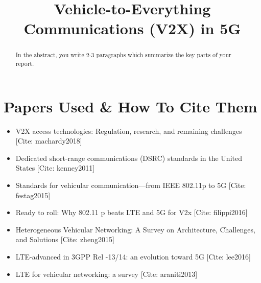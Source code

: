 \documentclass[conference,12pt,onecolumn]{IEEEtran}
\begin{document}
%
\title{Vehicle-to-Everything Communications (V2X) in 5G}


\author{
}


\maketitle

\begin{abstract}
In the abstract, you write 2-3 paragraphs which summarize the key parts of your report.
\end{abstract}


\IEEEpeerreviewmaketitle

\section{Papers Used \& How To Cite Them}
\begin{itemize}
\item V2X access technologies: Regulation, research, and remaining challenges [Cite: machardy2018] \cite{machardy2018}
\item Dedicated short-range communications (DSRC) standards in the United States [Cite: kenney2011] \cite{kenney2011}
\item Standards for vehicular communication---from IEEE 802.11p to 5G [Cite: festag2015]\cite{festag2015}
\item Ready to roll: Why 802.11 p beats LTE and 5G for V2x [Cite: filippi2016] \cite{filippi2016}
\item Heterogeneous Vehicular Networking: A Survey on Architecture, Challenges, and Solutions [Cite: zheng2015] \cite{zheng2015}
\item LTE-advanced in 3GPP Rel -13/14: an evolution toward 5G [Cite: lee2016] \cite{lee2016}
  \item LTE for vehicular networking: a survey [Cite: araniti2013] \cite{araniti2013}
  \end{itemize}
\end{document}
